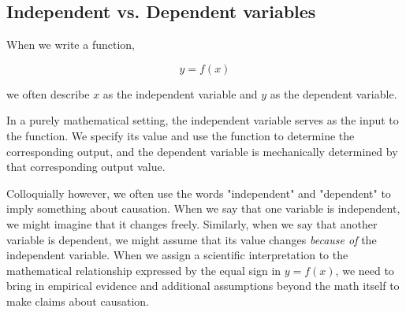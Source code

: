 \documentclass[12pt]{article}
\begin{document}
\subsection{Independent vs. Dependent variables}

When we write a function,

\[
y=f(x)
\]

we often describe $x$ as the independent variable and $y$ as the dependent variable.

In a purely mathematical setting, the independent variable serves as the input to the function. We specify its value and use the function to determine the corresponding output, and the dependent variable is mechanically determined by that corresponding output value. 

Colloquially however, we often use the words "independent" and "dependent" to imply something about causation. When we say that one variable is independent, we might imagine that it changes freely. Similarly, when we say that another variable is dependent, we might assume that its value changes \textit{because of} the independent variable. When we assign a scientific interpretation to the mathematical relationship expressed by the equal sign in $y=f(x)$, we need to bring in empirical evidence and additional assumptions beyond the math itself to make claims about causation.
\end{document}
